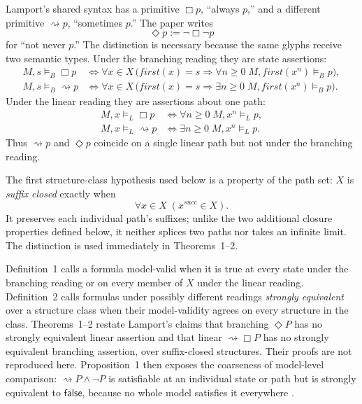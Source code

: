 Lamport's shared syntax has a primitive \(\Box p\), “always \(p\),”
and a different primitive \(\rightsquigarrow p\), “sometimes \(p\).”
The paper writes
\[
 \Diamond p:=\neg\Box\neg p
\]
for “not never \(p\).”  The distinction is necessary because the same
glyphs receive two semantic types.  Under the branching reading they are
state assertions:
\[
\begin{aligned}
 M,s\models_B\Box p
 &\Longleftrightarrow
 \forall x\in X\,
 \bigl(first(x)=s\Rightarrow
       \forall n\geq 0\;
       M,first(x^n)\models_Bp\bigr),\\
 M,s\models_B\rightsquigarrow p
 &\Longleftrightarrow
 \forall x\in X\,
 \bigl(first(x)=s\Rightarrow
       \exists n\geq 0\;
       M,first(x^n)\models_Bp\bigr).
\end{aligned}
\]
Under the linear reading they are assertions about one path:
\[
\begin{aligned}
 M,x\models_L\Box p
 &\Longleftrightarrow
   \forall n\geq0\;M,x^n\models_Lp,\\
 M,x\models_L\rightsquigarrow p
 &\Longleftrightarrow
   \exists n\geq0\;M,x^n\models_Lp.
\end{aligned}
\]
Thus \(\rightsquigarrow p\) and \(\Diamond p\) coincide on a single
linear path but not under the branching reading.

The first structure-class hypothesis used below is a property of the path set:
\(X\) is \emph{suffix closed} exactly when
\[
 \forall x\in X\;(x^{succ}\in X).
\]
It preserves each individual path's suffixes; unlike the two additional
closure properties defined below, it neither splices two paths nor takes an
infinite limit.  The distinction is used immediately in Theorems~1--2.

Definition~1 calls a formula model-valid when it is true at every state
under the branching reading or on every member of \(X\) under the linear
reading.  Definition~2 calls formulas under possibly different readings
\emph{strongly equivalent} over a structure class when their model-validity
agrees on every structure in the class.  Theorems~1--2 restate Lamport's
claims that branching \(\Diamond P\) has no strongly equivalent linear
assertion and that linear
\(\rightsquigarrow\Box P\) has no strongly equivalent branching assertion,
over suffix-closed structures.  Their proofs are not reproduced here.
Proposition~1 then exposes the coarseness of model-level comparison:
\(\rightsquigarrow P\land\neg P\) is satisfiable at an individual state or
path but is strongly equivalent to \(\mathsf{false}\), because no whole
model satisfies it everywhere \cite[pp.~153--155]{EmersonHalpern1986}.

